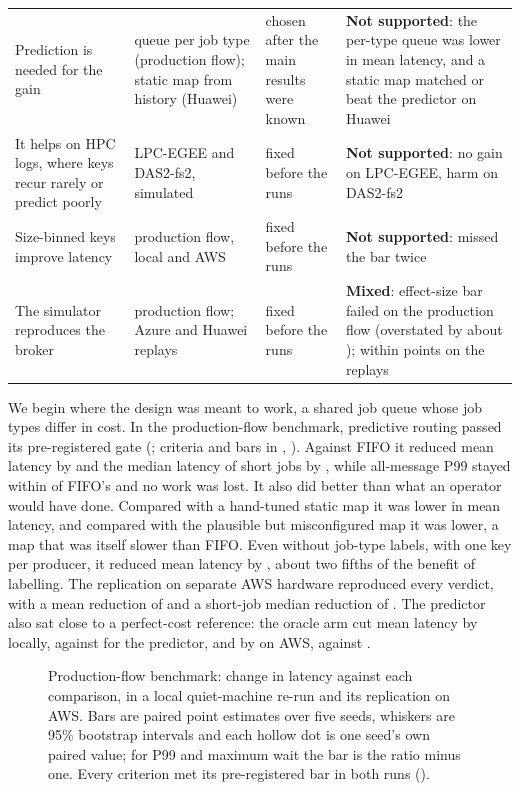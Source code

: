 \begin{table}[H]
\begin{tabularx}{\textwidth}{>{\raggedright\arraybackslash}p{4.3cm}>{\raggedright\arraybackslash}p{4.1cm}>{\raggedright\arraybackslash}p{2.6cm}L}
Prediction is needed for the gain & queue per job type (production flow); static map from history (Huawei) & chosen after the main results were known & \textbf{Not supported}: the per-type queue was \BasePtfVsPredAbs{} lower in mean latency, and a static map matched or beat the predictor on Huawei \\
It helps on HPC logs, where keys recur rarely or predict poorly & LPC-EGEE and DAS2-fs2, simulated & fixed before the runs & \textbf{Not supported}: no gain on LPC-EGEE, harm on DAS2-fs2 \\
Size-binned keys improve latency & production flow, local and AWS & fixed before the runs & \textbf{Not supported}: missed the bar twice \\
The simulator reproduces the broker & production flow; Azure and Huawei replays & fixed before the runs & \textbf{Mixed}: effect-size bar failed on the production flow (overstated by about \SimValOverstatePct{}); within \SimReplayGapMax{} points on the replays \\
\bottomrule
\end{tabularx}
\end{table}

We begin where the design was meant to work, a shared job queue whose job types differ in cost. In the production-flow
benchmark, predictive routing passed its pre-registered gate (; criteria and bars in , ). Against FIFO it reduced mean latency
by \VTwoMeanVsFifoAbs{} and the median latency of short jobs by \VTwoShortPFiftyVsFifoAbs{}, while all-message P99 stayed within
\VTwoPNinetyNine{} of FIFO's and no work was lost. It also did better than what an operator would have done. Compared with a
hand-tuned static map it was \VTwoVsTunedAbs{} lower in mean latency, and compared with the plausible but misconfigured map it
was \VTwoVsMisconfAbs{} lower, a map that was itself slower than FIFO. Even without job-type labels, with one key per producer, it
reduced mean latency by \VTwoZeroConfigAbs{}, about two fifths of the benefit of labelling. The replication on separate AWS hardware
reproduced every verdict, with a mean reduction of \EOneMeanVsFifoAbs{} and a short-job median reduction of
\EOneShortPFiftyVsFifoAbs{}. The predictor also sat close to a perfect-cost reference: the oracle arm cut mean latency by \VTwoOracleVsFifoAbs{} locally, against \VTwoMeanVsFifoAbs{} for the predictor, and by \EOneOracleVsFifoAbs{} on AWS, against \EOneMeanVsFifoAbs{}.

\begin{figure}[t]
  \centering
  
  \caption{Production-flow benchmark: change in latency against each comparison, in a local quiet-machine re-run and its replication on AWS. Bars are paired point estimates over five seeds, whiskers are 95\% bootstrap intervals and each hollow dot is one seed's own paired value; for P99 and maximum wait the bar is the ratio minus one. Every criterion met its pre-registered bar in both runs ().}\label{fig:prodflow}
\end{figure}

